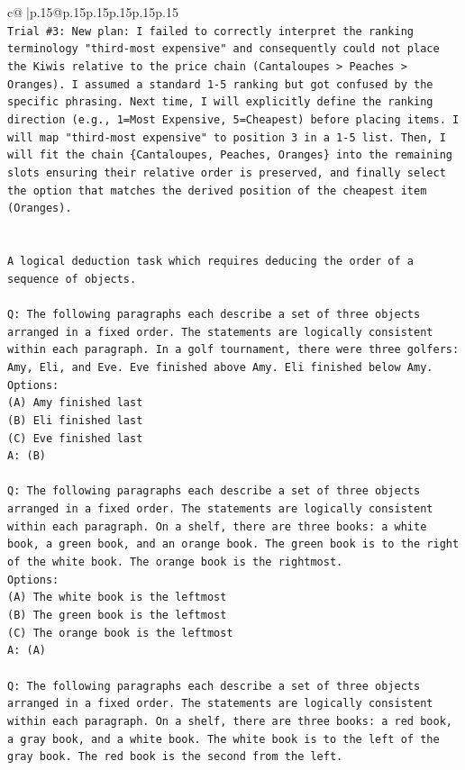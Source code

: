 \documentclass{article}
\begin{document}
{\begin{supertabular}{c@{$\;$}|p{.15\linewidth}@{}p{.15\linewidth}p{.15\linewidth}p{.15\linewidth}p{.15\linewidth}p{.15\linewidth}}
{{{\\ 
\texttt{Trial \#3: New plan: I failed to correctly interpret the ranking terminology "third{-}most expensive" and consequently could not place the Kiwis relative to the price chain (Cantaloupes > Peaches > Oranges). I assumed a standard 1{-}5 ranking but got confused by the specific phrasing. Next time, I will explicitly define the ranking direction (e.g., 1=Most Expensive, 5=Cheapest) before placing items. I will map "third{-}most expensive" to position 3 in a 1{-}5 list. Then, I will fit the chain \{Cantaloupes, Peaches, Oranges\} into the remaining slots ensuring their relative order is preserved, and finally select the option that matches the derived position of the cheapest item (Oranges).} \\
\\ 
\\ 
\texttt{A logical deduction task which requires deducing the order of a sequence of objects.} \\
\\ 
\texttt{Q: The following paragraphs each describe a set of three objects arranged in a fixed order. The statements are logically consistent within each paragraph. In a golf tournament, there were three golfers: Amy, Eli, and Eve. Eve finished above Amy. Eli finished below Amy.} \\
\texttt{Options:} \\
\texttt{(A) Amy finished last} \\
\texttt{(B) Eli finished last} \\
\texttt{(C) Eve finished last} \\
\texttt{A: (B)} \\
\\ 
\texttt{Q: The following paragraphs each describe a set of three objects arranged in a fixed order. The statements are logically consistent within each paragraph. On a shelf, there are three books: a white book, a green book, and an orange book. The green book is to the right of the white book. The orange book is the rightmost.} \\
\texttt{Options:} \\
\texttt{(A) The white book is the leftmost} \\
\texttt{(B) The green book is the leftmost} \\
\texttt{(C) The orange book is the leftmost} \\
\texttt{A: (A)} \\
\\ 
\texttt{Q: The following paragraphs each describe a set of three objects arranged in a fixed order. The statements are logically consistent within each paragraph. On a shelf, there are three books: a red book, a gray book, and a white book. The white book is to the left of the gray book. The red book is the second from the left.} \\
}}}
\end{supertabular}}
\end{document}
